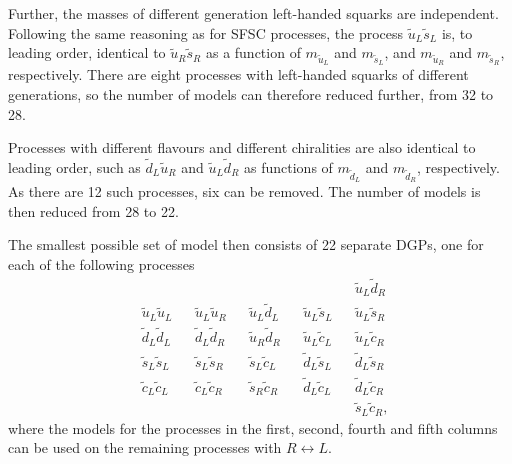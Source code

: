 \documentclass[twoside,english]{uiofysmaster}
\begin{document}
{{%

Further, the masses of different generation left-handed squarks are independent. Following the same reasoning as for SFSC processes, the process $\widetilde{u}_L \widetilde{s}_L$ is, to leading order, identical to $\widetilde{u}_R \widetilde{s}_R$ as a function of $m_{\widetilde{u}_L}$ and $m_{\widetilde{s}_L}$, and $m_{\widetilde{u}_R}$ and $m_{\widetilde{s}_R}$, respectively. There are eight processes with left-handed squarks of different generations, so the number of models can therefore reduced further, from 32 to 28.


Processes with different flavours and different chiralities are also identical to leading order, such as $\widetilde{d}_L \widetilde{u}_R$ and $\widetilde{u}_L \widetilde{d}_R$ as functions of $m_{\widetilde{d}_L}$ and $m_{\widetilde{d}_R}$, respectively. As there are 12 such processes, six can be removed. The number of models is then reduced from 28 to 22. 

The smallest possible set of model then consists of 22 separate DGPs, one for each of the following processes
\begin{align*}
& && && && && \widetilde{u}_L \widetilde{d}_R\\ 
& \widetilde{u}_L \widetilde{u}_L && \widetilde{u}_L \widetilde{u}_R && \widetilde{u}_L \widetilde{d}_L && \widetilde{u}_L \widetilde{s}_L && \widetilde{u}_L \widetilde{s}_R\\
& \widetilde{d}_L \widetilde{d}_L && \widetilde{d}_L \widetilde{d}_R && \widetilde{u}_R \widetilde{d}_R && \widetilde{u}_L \widetilde{c}_L && \widetilde{u}_L \widetilde{c}_R\\ 
& \widetilde{s}_L \widetilde{s}_L && \widetilde{s}_L \widetilde{s}_R && \widetilde{s}_L \widetilde{c}_L && \widetilde{d}_L \widetilde{s}_L && \widetilde{d}_L \widetilde{s}_R\\
& \widetilde{c}_L \widetilde{c}_L && \widetilde{c}_L \widetilde{c}_R && \widetilde{s}_R \widetilde{c}_R && \widetilde{d}_L \widetilde{c}_L && \widetilde{d}_L \widetilde{c}_R \\
&  &&  &&  && && \widetilde{s}_L \widetilde{c}_R,
\end{align*}
where the models for the processes in the first, second, fourth and fifth columns can be used on the remaining processes with $R \leftrightarrow L$.


}}
\end{document}
